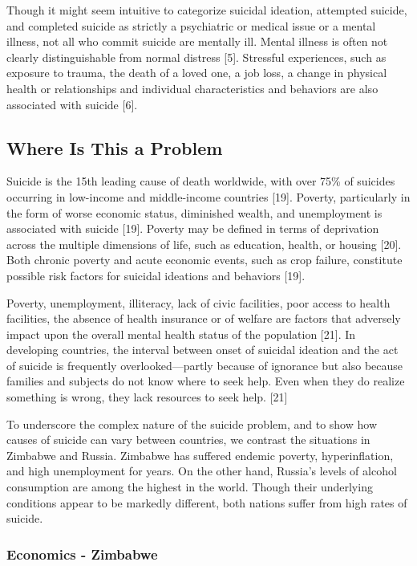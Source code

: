 \documentclass[]{article}
\begin{document}
Though it might seem intuitive to categorize suicidal ideation,
attempted suicide, and completed suicide as strictly a psychiatric or
medical issue or a mental illness, not all who commit suicide are
mentally ill. Mental illness is often not clearly distinguishable from
normal distress {[}5{]}. Stressful experiences, such as exposure to
trauma, the death of a loved one, a job loss, a change in physical
health or relationships and individual characteristics and behaviors are
also associated with suicide {[}6{]}.

\subsection{Where Is This a Problem}\label{where-is-this-a-problem}

Suicide is the 15th leading cause of death worldwide, with over 75\% of
suicides occurring in low-income and middle-income countries {[}19{]}.
Poverty, particularly in the form of worse economic status, diminished
wealth, and unemployment is associated with suicide {[}19{]}. Poverty
may be defined in terms of deprivation across the multiple dimensions of
life, such as education, health, or housing {[}20{]}. Both chronic
poverty and acute economic events, such as crop failure, constitute
possible risk factors for suicidal ideations and behaviors {[}19{]}.

Poverty, unemployment, illiteracy, lack of civic facilities, poor access
to health facilities, the absence of health insurance or of welfare are
factors that adversely impact upon the overall mental health status of
the population {[}21{]}. In developing countries, the interval between
onset of suicidal ideation and the act of suicide is frequently
overlooked---partly because of ignorance but also because families and
subjects do not know where to seek help. Even when they do realize
something is wrong, they lack resources to seek help. {[}21{]}

To underscore the complex nature of the suicide problem, and to show how
causes of suicide can vary between countries, we contrast the situations
in Zimbabwe and Russia. Zimbabwe has suffered endemic poverty,
hyperinflation, and high unemployment for years. On the other hand,
Russia's levels of alcohol consumption are among the highest in the
world. Though their underlying conditions appear to be markedly
different, both nations suffer from high rates of suicide.

\subsubsection{Economics - Zimbabwe}\label{economics---zimbabwe}
\end{document}
